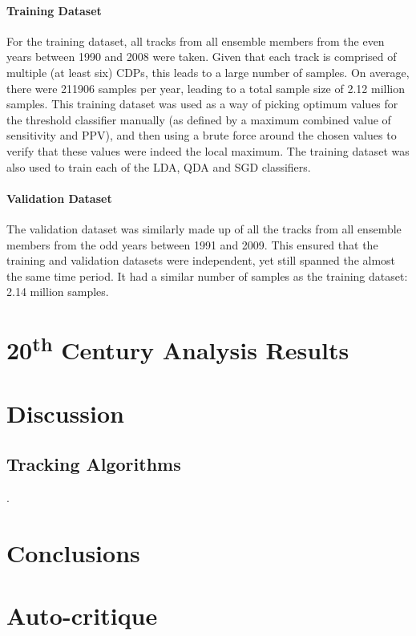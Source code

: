 \documentclass[pdftex,12pt,a4paper]{report}
\newcommand{\ts}{\textsuperscript}
\begin{document}
\subsubsection{Training Dataset}
\label{sec:training_dataset}
For the training dataset, all tracks from all ensemble members from the even years between 1990 and
2008 were taken. Given that each track is comprised of multiple (at least six) CDPs, this leads to a
large number of samples. On average, there were \SI{211906}{} samples per year, leading to a total
sample size of 2.12 million samples. This training dataset was used as a way of picking optimum
values for the threshold classifier manually (as defined by a maximum combined value of sensitivity
and PPV), and then using a brute force around the chosen values to verify that these values were
indeed the local maximum. The training dataset was also used to train each of the LDA, QDA and SGD
classifiers.

\subsubsection{Validation Dataset} The validation dataset was similarly made up of all the tracks
from all ensemble members from the odd years between 1991 and 2009. This ensured that the training
and validation datasets were independent, yet still spanned the almost the same time period. It had
a similar number of samples as the training dataset: 2.14 million samples.

\chapter{20\ts{th} Century Analysis Results}
\label{chap:results_analysis}

\chapter{Discussion}
\label{chap:discussion}

\section{Tracking Algorithms}
\label{sec:discussion_tracking_algs}.

\chapter{Conclusions}
\label{chap:conclusion}

\chapter*{Auto-critique}

\printbibliography[title={References}]

\end{document}
